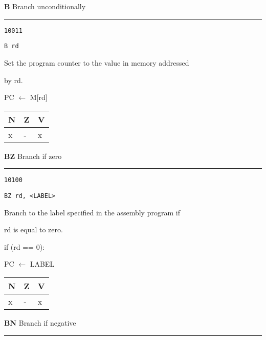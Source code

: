 \documentclass{article}
\begin{document}
\bigskip\bigskip

\flushleft
\LARGE\textbf{B} \large \hfill Branch unconditionally

\kern-3pt
\noindent\rule{16.5cm}{0.4pt}
\normalsize

{\large
	 \texttt{10011} \par
	\smallbreak
	 \texttt{B rd} \par
	\smallbreak
	 Set the program counter to the value in memory addressed  \par
	\makebox[3.5cm][l]{  } by rd. \par
	\smallbreak
	 PC $\leftarrow$ M[rd] \par
	\medbreak
	 \begin{tabular}{lll} N \quad & Z \quad & V \\ \hline x & - & x \\ \end{tabular}
}

\bigskip\bigskip

\flushleft
\LARGE\textbf{BZ} \large \hfill Branch if zero

\kern-3pt
\noindent\rule{16.5cm}{0.4pt}
\normalsize

{\large
	 \texttt{10100} \par
	\smallbreak
	 \texttt{BZ rd, <LABEL>} \par
	\smallbreak
	 Branch to the label specified in the assembly program if  \par
	\makebox[3.5cm][l]{  } rd is equal to zero. \par
	\smallbreak
	 if (rd == 0): \par
	\makebox[4cm][l]{  } PC $\leftarrow$ LABEL \par
	\medbreak\medbreak
	 \begin{tabular}{lll} N \quad & Z \quad & V \\ \hline x & - & x \\ \end{tabular}
}

\pagebreak

\flushleft
\LARGE\textbf{BN} \large \hfill Branch if negative

\kern-3pt
\noindent\rule{16.5cm}{0.4pt}
\normalsize
\end{document}
